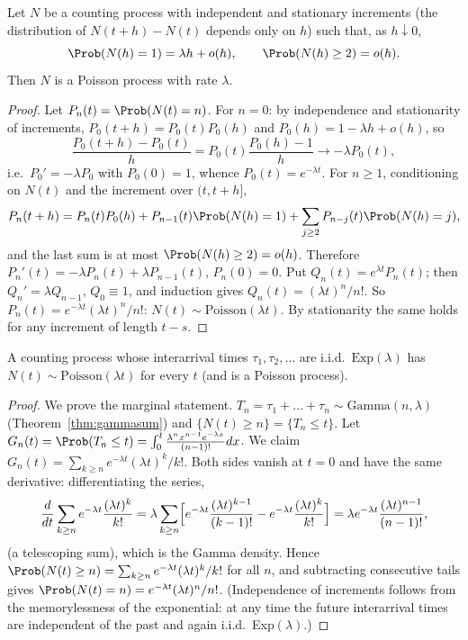 \begin{theorem}\label{thm:ppinfinitesimal}
Let $N$ be a counting process with independent and stationary increments (the
distribution of $N(t+h)-N(t)$ depends only on $h$) such that, as $h\downarrow0$,
\[
\Prob(N(h)=1)=\lambda h+o(h),\qquad\Prob(N(h)\ge2)=o(h).
\]
Then $N$ is a Poisson process with rate $\lambda$.
\end{theorem}
\begin{proof}
Let $P_n(t)=\Prob(N(t)=n)$. For $n=0$: by independence and stationarity of increments,
$P_0(t+h)=P_0(t)P_0(h)$ and $P_0(h)=1-\lambda h+o(h)$, so
\[
\frac{P_0(t+h)-P_0(t)}h=P_0(t)\frac{P_0(h)-1}h\to-\lambda P_0(t),
\]
i.e.\ $P_0'=-\lambda P_0$ with $P_0(0)=1$, whence $P_0(t)=e^{-\lambda t}$. For $n\ge1$,
conditioning on $N(t)$ and the increment over $(t,t+h]$,
\[
P_n(t+h)=P_n(t)P_0(h)+P_{n-1}(t)\Prob(N(h)=1)+\sum_{j\ge2}P_{n-j}(t)\Prob(N(h)=j),
\]
and the last sum is at most $\Prob(N(h)\ge2)=o(h)$. Therefore
$P_n'(t)=-\lambda P_n(t)+\lambda P_{n-1}(t)$, $P_n(0)=0$. Put $Q_n(t)=e^{\lambda t}P_n(t)$;
then $Q_n'=\lambda Q_{n-1}$, $Q_0\equiv1$, and induction gives $Q_n(t)=(\lambda t)^n/n!$.
So $P_n(t)=e^{-\lambda t}(\lambda t)^n/n!$: $N(t)\sim\mathrm{Poisson}(\lambda t)$. By
stationarity the same holds for any increment of length $t-s$.
\end{proof}

\begin{theorem}\label{thm:ppinterarrival}
A counting process whose interarrival times $\tau_1,\tau_2,\dots$ are i.i.d.\
$\mathrm{Exp}(\lambda)$ has $N(t)\sim\mathrm{Poisson}(\lambda t)$ for every $t$ (and is a
Poisson process).
\end{theorem}
\begin{proof}
We prove the marginal statement. $T_n=\tau_1+\dots+\tau_n\sim\mathrm{Gamma}(n,\lambda)$
(Theorem~\ref{thm:gammasum}) and $\{N(t)\ge n\}=\{T_n\le t\}$. Let
$G_n(t)=\Prob(T_n\le t)=\int_0^t\frac{\lambda^nx^{n-1}e^{-\lambda x}}{(n-1)!}dx$. We claim
$G_n(t)=\sum_{k\ge n}e^{-\lambda t}(\lambda t)^k/k!$. Both sides vanish at $t=0$ and have
the same derivative: differentiating the series,
\[
\frac d{dt}\sum_{k\ge n}e^{-\lambda t}\frac{(\lambda t)^k}{k!}
=\lambda\sum_{k\ge n}\Bigl[e^{-\lambda t}\frac{(\lambda t)^{k-1}}{(k-1)!}-e^{-\lambda t}\frac{(\lambda t)^k}{k!}\Bigr]
=\lambda e^{-\lambda t}\frac{(\lambda t)^{n-1}}{(n-1)!},
\]
(a telescoping sum), which is the Gamma density. Hence
$\Prob(N(t)\ge n)=\sum_{k\ge n}e^{-\lambda t}(\lambda t)^k/k!$ for all $n$, and subtracting
consecutive tails gives $\Prob(N(t)=n)=e^{-\lambda t}(\lambda t)^n/n!$. (Independence of
increments follows from the memorylessness of the exponential: at any time the future
interarrival times are independent of the past and again i.i.d.\ Exp$(\lambda)$.)
\end{proof}

